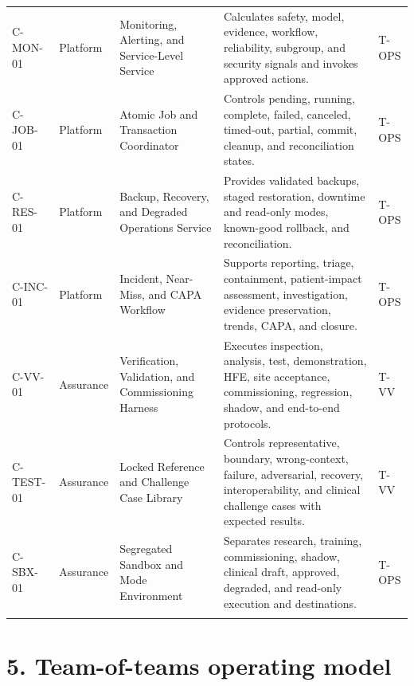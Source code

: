 \documentclass[11pt,letterpaper]{article}
\begin{document}
\begin{small}
\begin{longtable}{@{}L{0.12\textwidth}L{0.13\textwidth}L{0.23\textwidth}L{0.37\textwidth}L{0.08\textwidth}@{}}
\addlinespace[2pt]
C-MON-01 & Platform & Monitoring, Alerting, and Service-Level Service & Calculates safety, model, evidence, workflow, reliability, subgroup, and security signals and invokes approved actions. & T-OPS \\
\addlinespace[2pt]
C-JOB-01 & Platform & Atomic Job and Transaction Coordinator & Controls pending, running, complete, failed, canceled, timed-out, partial, commit, cleanup, and reconciliation states. & T-OPS \\
\addlinespace[2pt]
C-RES-01 & Platform & Backup, Recovery, and Degraded Operations Service & Provides validated backups, staged restoration, downtime and read-only modes, known-good rollback, and reconciliation. & T-OPS \\
\addlinespace[2pt]
C-INC-01 & Platform & Incident, Near-Miss, and CAPA Workflow & Supports reporting, triage, containment, patient-impact assessment, investigation, evidence preservation, trends, CAPA, and closure. & T-OPS \\
\addlinespace[2pt]
C-VV-01 & Assurance & Verification, Validation, and Commissioning Harness & Executes inspection, analysis, test, demonstration, HFE, site acceptance, commissioning, regression, shadow, and end-to-end protocols. & T-VV \\
\addlinespace[2pt]
C-TEST-01 & Assurance & Locked Reference and Challenge Case Library & Controls representative, boundary, wrong-context, failure, adversarial, recovery, interoperability, and clinical challenge cases with expected results. & T-VV \\
\addlinespace[2pt]
C-SBX-01 & Assurance & Segregated Sandbox and Mode Environment & Separates research, training, commissioning, shadow, clinical draft, approved, degraded, and read-only execution and destinations. & T-OPS \\
\addlinespace[2pt]
\end{longtable}
\end{small}

\section{5. Team-of-teams operating model}
\end{document}

